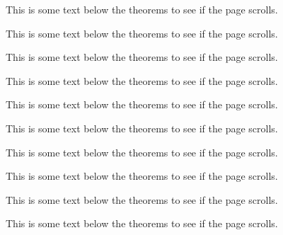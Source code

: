 \documentclass{ximera}
\begin{document}
This is some text below the theorems to see if the page scrolls.

This is some text below the theorems to see if the page scrolls.

This is some text below the theorems to see if the page scrolls.

This is some text below the theorems to see if the page scrolls.

This is some text below the theorems to see if the page scrolls.

This is some text below the theorems to see if the page scrolls.

This is some text below the theorems to see if the page scrolls.

This is some text below the theorems to see if the page scrolls.

This is some text below the theorems to see if the page scrolls.

This is some text below the theorems to see if the page scrolls.
\end{document}
